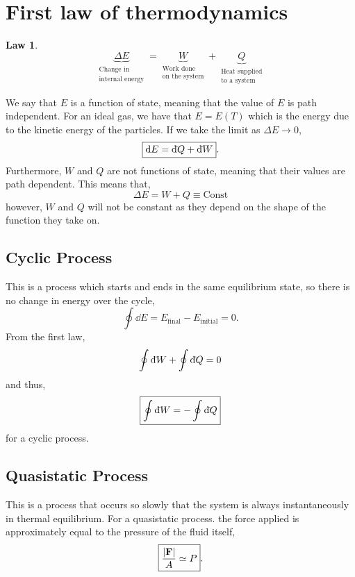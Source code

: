 \documentclass{book}
\newtheorem{law}{Law}
\newcommand{\dbar}{\mathrm{d}\hspace*{-0.08em}\bar{}\hspace*{0.1em}}
\begin{document}
\section{First law of thermodynamics}
\begin{law}
\begin{equation}
	\boxed{\underbrace{\Delta E}_{\substack{\text{Change in}\\\text{internal energy}} } = \underbrace{W}_{\substack{\text{Work done}\\\text{on the system}}} + \underbrace{Q}_{\substack{\text{Heat supplied}\\\text{to a system}}}}
\end{equation}
\end{law}
\noindent We say that $E$ is a function of state, meaning that the value of $E$ is path independent. For an ideal gas, we have that $E = E(T)$ which is the energy due to the kinetic energy of the particles. If we take the limit as $\Delta E \to 0$,
\begin{equation}
	\boxed{\dd{E} = \dbar Q + \dbar W}.
\end{equation}
Furthermore, $W$ and $Q$ are not functions of state, meaning that their values are path dependent. This means that,
\begin{equation}
	\Delta E = W + Q \equiv \text{Const}
\end{equation}
however, $W$ and $Q$ will not be constant as they depend on the shape of the function they take on.
\subsection{Cyclic Process}
This is a process which starts and ends in the same equilibrium state, so there is no change in energy over the cycle,
\begin{equation}
	\oint\dd{E} = E_{\text{final}} - E_{\text{initial}} = 0.
\end{equation}
From the first law,
\begin{equation}
	\oint \dbar{W} + \oint\dbar{Q} = 0
\end{equation}
and thus,
\begin{equation}
	\boxed{\oint\dbar{W} = -\oint \dbar{Q}}
\end{equation}
for a cyclic process.
\subsection{Quasistatic Process}
This is a process that occurs so slowly that the system is always instantaneously in thermal equilibrium. For a quasistatic process. the force applied is approximately equal to the pressure of the fluid itself,
\begin{equation}
	\boxed{\frac{\left|\vb{F}\right|}{A}\simeq P}.
\end{equation}
\end{document}
